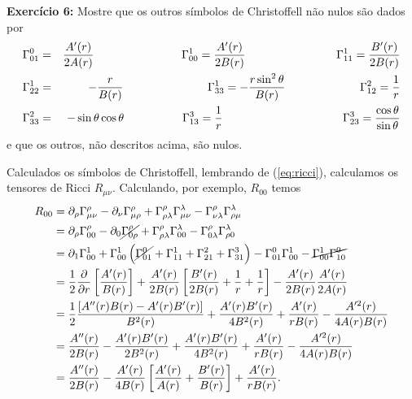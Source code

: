 \documentclass[12pt,a4paper,titlepage,brazil]{article}
\begin{document}
\begin{tcolorbox}
  {\bf Exercício 6:} Mostre que os outros símbolos de Christoffell não nulos são dados por
\begin{eqnarray}
  \Gamma^{0}_{0 1} & = & \frac{A'(r)}{2 A (r)} \hspace{2.7cm} \Gamma^{1}_{0 0} =
  \frac{A'(r)}{2 B(r)} \hspace{2.8cm} \Gamma^{1}_{1 1} = \frac{B'(r)}{2 B(r)} \nonumber \\
  \Gamma^{1}_{2 2} & = & - \frac{r}{B (r)} \hspace{2.6cm} \Gamma^{1}_{3 3} =
  - \frac{r \sin^{2} \theta}{B(r)} \hspace{2.3cm} \Gamma^{2}_{1 2} = \frac{1}{r}\\
  \Gamma^{2}_{3 3} & = & - \sin \theta \cos \theta \hspace{1.8cm} \Gamma^{3}_{1 3} =
  \frac{1}{r} \hspace{3.7cm} \Gamma^{3}_{2 3} = \frac{\cos \theta}{\sin \theta} \nonumber
\end{eqnarray}
e que os outros, não descritos acima, são nulos.
\end{tcolorbox}

Calculados os símbolos de Christoffell, lembrando de (\ref{eq:ricci}), calculamos os tensores de Ricci $R_{\mu \nu}$. Calculando, por exemplo, $R_{0 0}$ temos
\begin{align}
  R_{0 0} & = \partial_{\rho} \Gamma^{\rho}_{\mu \nu} - \partial_{\nu} \Gamma^{\rho}_{\mu \rho} + \Gamma^{\rho}_{\rho \lambda} \Gamma^{\lambda}_{\mu \nu} - \Gamma^{\rho}_{\nu \lambda} \Gamma^{\lambda}_{\rho \mu} \\
          & = \partial_{\rho} \Gamma^{\rho}_{0 0} - \partial_{0} \cancel{\Gamma^{\rho}_{0 \rho}} + \Gamma^{\rho}_{\rho \lambda} \Gamma^{\lambda}_{0 0} - \Gamma^{\rho}_{0 \lambda} \Gamma^{\lambda}_{\rho 0} \\
          & = \partial_{1} \Gamma^{1}_{0 0} + \Gamma^{1}_{0 0} \left(\cancel{\Gamma^{0}_{0 1}} + \Gamma^{1}_{1 1} + \Gamma^{2}_{2 1} + \Gamma^{3}_{3 1}\right) - \Gamma^{0}_{0 1} \Gamma^{1}_{0 0} - \cancel{\Gamma^{1}_{0 0} \Gamma^{0}_{1 0}}\\
          & = \frac{1}{2} \frac{\partial}{\partial r} \left[\frac{A' (r)}{B (r)}\right] + \frac{A' (r)}{2 B (r)} \left[\frac{B' (r)}{2 B (r)} + \frac{1}{r} + \frac{1}{r}\right] - \frac{A' (r)}{2 B (r)} \frac{A' (r)}{2 A (r)}\\
          & = \frac{1}{2} \frac{\left[A''(r) B(r) - A'(r) B'(r)\right]}{B^2 (r)} + \frac{A' (r) B' (r)}{4 B^2 (r)} + \frac{A' (r)}{r B (r)} - \frac{A'^2 (r)}{4 A (r) B (r)}\\
          & = \frac{A''(r)}{2 B (r)} - \frac{A'(r) B'(r)}{2 B^2 (r)} + \frac{A' (r) B' (r)}{4 B^2 (r)} + \frac{A' (r)}{r B (r)} - \frac{A'^2 (r)}{4 A (r) B (r)}\\
          & = \frac{A'' (r)}{2 B (r)} - \frac{A' (r)}{4 B (r)} \left[ \frac{A' (r)}{A (r)} + \frac{B' (r)}{B (r)}\right] + \frac{A' (r)}{r B (r)} .
\end{align}
\end{document}
